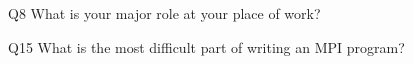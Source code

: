 \begin{description}%
\item{Q8} What is your major role at your place of work?%
\item{Q15} What is the most difficult part of writing an MPI program?%
\end{description}%
